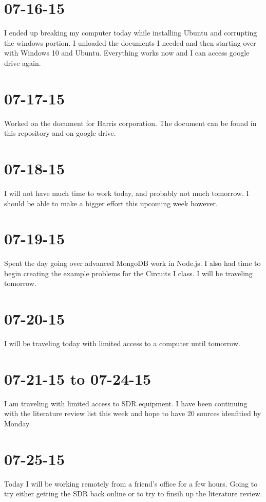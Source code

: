 \documentclass{article}
\begin{document}
	\section{07-16-15}
	I ended up breaking my computer today while installing Ubuntu and corrupting the windows portion. I unloaded
	the documents I needed and then starting over with Windows 10 and Ubuntu. Everything works now and I can access
	google drive again.
	
	\section{07-17-15}
	Worked on the document for Harris corporation. The document can be found in this repository and on google drive.

	\section{07-18-15}
	I will not have much time to work today, and probably not much tomorrow. I should be able to make a bigger effort
	this upcoming week however. 	
	
	\section{07-19-15}
	Spent the day going over advanced MongoDB work in Node.js. I also had time to begin creating the example problems
	for the Circuits I class. I will be traveling tomorrow.

	\section{07-20-15}
	I will be traveling today with limited access to a computer until tomorrow. 

	\section{07-21-15 to 07-24-15} 
	I am traveling with limited access to SDR equipment. I have been continuing with the 
	literature review list this week and hope to have 20 sources idenfitied by Monday

	\section{07-25-15}
	Today I will be working remotely from a friend's office for a few hours. Going to try either
	getting the SDR back online or to try to finsih up the literature review. 
\end{document}
